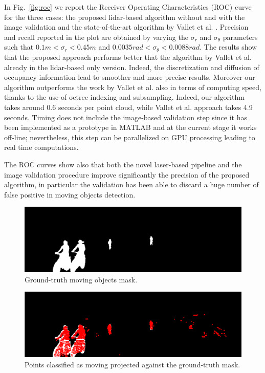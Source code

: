 In Fig.~\ref{fig:roc} we report the Receiver Operating Characteristics (ROC) curve for the three cases:  the proposed lidar-based algorithm without and with the image validation and the state-of-the-art algorithm by Vallet et al. \cite{vallet2015extracting}.
Precision and recall reported in the plot are obtained by varying the $\sigma_r$ and $\sigma_{\theta}$ parameters such that $0.1m<\sigma_r<0.45m$ and $0.0035rad<\sigma_{\theta}<0.0088rad$. The results show that the proposed approach performs better that the algorithm by Vallet et al. already in the lidar-based only version. Indeed, the discretization and diffusion of occupancy information lead to smoother and more precise results. Moreover our algorithm outperforms the work by Vallet et al. also in terms of computing speed, thanks to the use of octree indexing and subsampling. Indeed, our algorithm takes around 0.6 seconds per point cloud, while Vallet et al. approach takes 4.9 seconds.
Timing does not include the image-based validation step since it has been implemented as a prototype in MATLAB and at the current stage it works off-line; nevertheless, this step can be parallelized on GPU processing leading to real time computations.

The ROC curves show also that both the novel laser-based pipeline and the image validation procedure improve significantly the precision of the proposed algorithm, in particular the validation has been able to discard a huge number of false positive in moving objects detection.

\begin{figure}[t]
\centering
\includegraphics[width=0.98\columnwidth]{./img/ch-laser/mask-129}
\caption{Ground-truth moving objects mask.}
\label{fig:gt}
\end{figure}
\begin{figure}[t]
\centering
\includegraphics[width=0.98\columnwidth]{./img/ch-laser/points_result_on_mask}
\caption{Points classified as moving projected against the ground-truth mask.}
\label{fig:points}
\end{figure}

